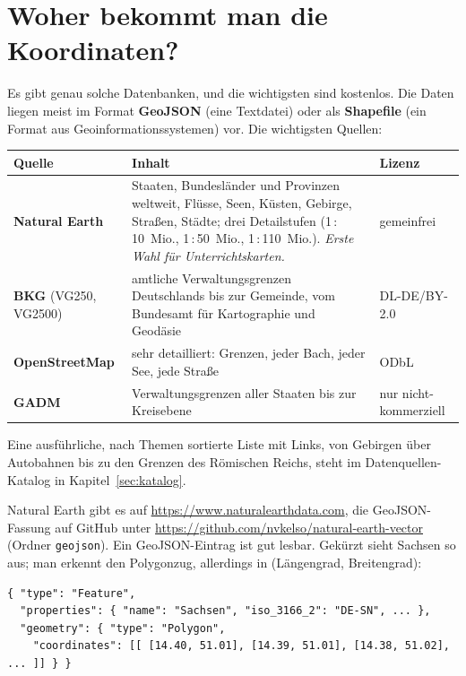 \section{Woher bekommt man die Koordinaten?}

Es gibt genau solche Datenbanken, und die wichtigsten sind kostenlos. Die Daten liegen meist im Format \textbf{GeoJSON} (eine Textdatei) oder als \textbf{Shapefile} (ein Format aus Geoinformationssystemen) vor. Die wichtigsten Quellen:

\begin{center}
\small
\begin{tabular}{@{}>{\raggedright\arraybackslash}p{3.2cm}>{\raggedright\arraybackslash}p{8.2cm}>{\raggedright\arraybackslash}p{3cm}@{}}
	\toprule
	\textbf{Quelle} & \textbf{Inhalt} & \textbf{Lizenz} \\
	\midrule
	\textbf{Natural Earth} & Staaten, Bundesländer und Provinzen weltweit, Flüsse, Seen, Küsten, Gebirge, Straßen, Städte; drei Detailstufen (1\,:\,10~Mio., 1\,:\,50~Mio., 1\,:\,110~Mio.). \textit{Erste Wahl für Unterrichtskarten.} & gemeinfrei \\
	\addlinespace
	\textbf{BKG} (VG250, VG2500) & amtliche Verwaltungsgrenzen Deutschlands bis zur Gemeinde, vom Bundesamt für Kartographie und Geodäsie & DL-DE/BY-2.0 \\
	\addlinespace
	\textbf{OpenStreetMap} & sehr detailliert: Grenzen, jeder Bach, jeder See, jede Straße & ODbL \\
	\addlinespace
	\textbf{GADM} & Verwaltungsgrenzen aller Staaten bis zur Kreisebene & nur nicht-kommerziell \\
	\bottomrule
\end{tabular}
\end{center}

Eine ausführliche, nach Themen sortierte Liste mit Links, von Gebirgen über Autobahnen bis zu den Grenzen des Römischen Reichs, steht im Datenquellen-Katalog in Kapitel~\ref{sec:katalog}.

Natural Earth gibt es auf \url{https://www.naturalearthdata.com}, die GeoJSON-Fassung auf GitHub unter \url{https://github.com/nvkelso/natural-earth-vector} (Ordner \texttt{geojson}). Ein GeoJSON-Eintrag ist gut lesbar. Gekürzt sieht Sachsen so aus; man erkennt den Polygonzug, allerdings in (Längengrad, Breitengrad):

\begin{lstlisting}[style=latex]
{ "type": "Feature",
  "properties": { "name": "Sachsen", "iso_3166_2": "DE-SN", ... },
  "geometry": { "type": "Polygon",
    "coordinates": [[ [14.40, 51.01], [14.39, 51.01], [14.38, 51.02], ... ]] } }
\end{lstlisting}

